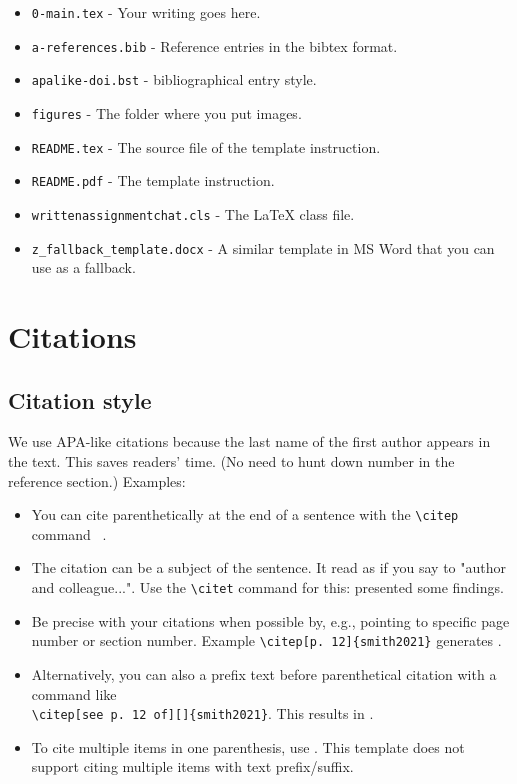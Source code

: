 \documentclass{writtenassignmentchat}
\begin{document}
\begin{itemize}
  \item \verb|0-main.tex| - Your writing goes here.
  \item \verb|a-references.bib| - Reference entries in the bibtex format.
  \item \verb|apalike-doi.bst| - bibliographical entry style.
  \item \verb|figures| - The folder where you put images.
  \item \verb|README.tex| - The source file of the template instruction.
  \item \verb|README.pdf| - The template instruction.
  \item \verb|writtenassignmentchat.cls| - The \LaTeX{} class file.
  \item \verb|z_fallback_template.docx| - A similar template in MS Word that you can use as a fallback.
\end{itemize}

\section{Citations}

\subsection{Citation style}

We use APA-like citations because the last name of the first author appears in the text. 
This saves readers' time. (No need to hunt down number in the reference section.)
Examples:
%
\begin{itemize}
  \item You can cite parenthetically at the end of a sentence with the \verb|\citep| command  ~\citep{smith2021}.
  \item The citation can be a subject of the sentence. It read as if you say to "author and colleague...". Use the \verb|\citet| command for this: \citet{brown2020} presented some findings.
  \item Be precise with your citations when possible by, e.g., pointing to specific page number or section number. Example \verb|\citep[p. 12]{smith2021}| generates \citep[p. 12]{smith2021}.
  \item Alternatively, you can also a prefix text before parenthetical citation with a command like\\ \verb|\citep[see p. 12 of][]{smith2021}|. This results in \citep[see p. 12 of][]{smith2021}. 
  \item To cite multiple items in one parenthesis, use \citep{smith2021, brown2020}. This template does not support citing multiple items with text prefix/suffix.
\end{itemize}
%
\end{document}
